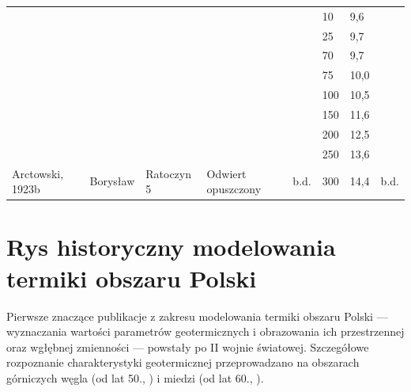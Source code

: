 \documentclass[11.5pt,twoside]{report}
\begin{document}
\begin{table}
\begin{tabular}{llllllll}
		&  &  &  &  & 10 & 9,6 &  \\
		&  &  &  &  & 25 & 9,7 &  \\
		&  &  &  &  & 70 & 9,7 &  \\
		&  &  &  &  & 75 & 10,0 &  \\
		&  &  &  &  & 100 & 10,5 &  \\
		&  &  &  &  & 150 & 11,6 &  \\
		&  &  &  &  & 200 & 12,5 &  \\
		&  &  &  &  & 250 & 13,6 &  \\
		\multirow{-9}{*}{Arctowski, 1923b} & \multirow{-9}{*}{Borysław} & \multirow{-9}{*}{Ratoczyn 5} & \multirow{-9}{*}{Odwiert opuszczony} & \multirow{-9}{*}{b.d.} & 300 & 14,4 & \multirow{-9}{*}{b.d.} \\ \hline
	\end{tabular}
\end{table}

\section{Rys historyczny modelowania termiki obszaru Polski}

Pierwsze znaczące publikacje z zakresu modelowania termiki obszaru Polski --- wyznaczania wartości parametrów geotermicznych i obrazowania ich przestrzennej oraz wgłębnej zmienności --- powstały po II wojnie światowej. Szczegółowe rozpoznanie charakterystyki geotermicznej przeprowadzano na obszarach górniczych węgla (od lat 50., \parencite{bibid}) i miedzi (od lat 60., \parencite{bibid}). 
\end{document}

